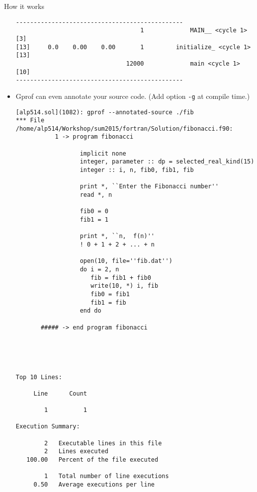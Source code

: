 \documentclass[10pt,t]{beamer}
\begin{document}
\begin{frame}{How it works}
\begin{itemize}
\begin{lstlisting}
-----------------------------------------------
                                   1             MAIN__ <cycle 1> [3]
[13]     0.0    0.00    0.00       1         initialize_ <cycle 1> [13]
                               12000             main <cycle 1> [10]
-----------------------------------------------
      \end{lstlisting}
    \item Gprof can even annotate your source code. (Add option \lstinline|-g| at compile time.)
      \begin{lstlisting}
[alp514.sol](1082): gprof --annotated-source ./fib
*** File /home/alp514/Workshop/sum2015/fortran/Solution/fibonacci.f90:
           1 -> program fibonacci

                  implicit none
                  integer, parameter :: dp = selected_real_kind(15)
                  integer :: i, n, fib0, fib1, fib

                  print *, ``Enter the Fibonacci number''
                  read *, n

                  fib0 = 0
                  fib1 = 1

                  print *, ``n,  f(n)''
                  ! 0 + 1 + 2 + ... + n

                  open(10, file=''fib.dat'')
                  do i = 2, n
                     fib = fib1 + fib0
                     write(10, *) i, fib
                     fib0 = fib1
                     fib1 = fib
                  end do

       ##### -> end program fibonacci





Top 10 Lines:

     Line      Count

        1          1

Execution Summary:

        2   Executable lines in this file
        2   Lines executed
   100.00   Percent of the file executed

        1   Total number of line executions
     0.50   Average executions per line
      \end{lstlisting}
  \end{itemize}
\end{frame}
\end{document}
